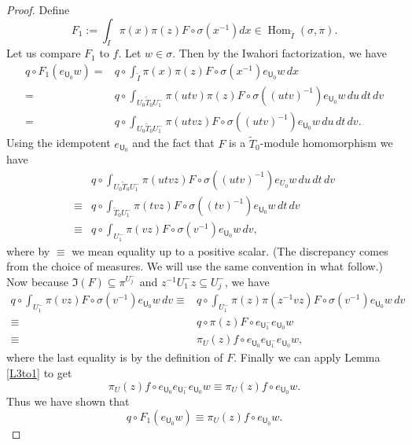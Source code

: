 \documentclass[10pt,a4paper]{amsart}
\newcommand{\Hom}{\operatorname{Hom}}
\newcommand{\It}{\widetilde{I}}
\newcommand{\Tt}{\widetilde{T}}
\newcommand{\Uf}{\mathsf{U}}
\begin{document}
\begin{proof}
    Define
    \[
    F_{1}:=\int_{\It}\pi(x)\pi(z)F\circ \sigma(x^{-1})dx\in\Hom_{\It}(\sigma,\pi).
    \]
    Let us compare $F_1$ to $f$. Let $w\in \sigma$. Then by the Iwahori factorization, we have
	\begin{align*}
		q\circ F_1(e_{{\Uf}_{0}}w)=&q\circ \int_{\It} \pi(x)\pi(z)F\circ \sigma(x^{-1}) e_{{\Uf}_{0}}w\,dx\\
		=&q\circ \int_{U_{0}\Tt_{0}U^{-}_{1}} \pi(utv)\pi(z)F\circ \sigma((utv)^{-1}) e_{{\Uf}_{0}}w \,du\,dt\,dv\\
		=&q\circ \int_{U_{0}\Tt_{0}U^{-}_{1}} \pi(utvz)F\circ \sigma((utv)^{-1}) e_{{\Uf}_{0}}w \,du\,dt\,dv.
	\end{align*}
	Using the idempotent $e_{{\Uf}_{0}}$ and the fact that $F$ is a $\Tt_{0}$-module homomorphism we have 
	\begin{align*}
		&q\circ \int_{U_{0}\Tt_{0}U^{-}_{1}} \pi(utvz)F\circ \sigma((utv)^{-1}) e_{U_{0}}w \,du\, dt\, dv\\
        \equiv&q\circ \int_{\Tt_{0}U^{-}_{1}} \pi(tvz)F\circ \sigma((tv)^{-1}) e_{{\Uf}_{0}}w \,dt\,dv\\
		\equiv&q\circ \int_{U^{-}_{1}} \pi(vz)F\circ \sigma(v^{-1}) e_{{\Uf}_{0}}w \,dv,
	\end{align*}
    where by $\equiv$ we mean equality up to a positive scalar. (The discrepancy comes from the choice of measures. We will use the same convention in what follow.)
	Now because $\Im(F)\subseteq \pi^{U^{-}_{j}}$ and  $z^{-1}U^{-}_{1}z\subseteq U^{-}_{j}$, we have
	\begin{align*}
		q\circ \int_{U^{-}_{1}} \pi(vz)F\circ \sigma(v^{-1}) e_{{\Uf}_{0}}w \,dv
        \equiv&q\circ \int_{U^{-}_{1}} \pi(z)\pi(z^{-1}vz)F\circ \sigma(v^{-1}) e_{{\Uf}_{0}}w \,dv\\
		\equiv&q\circ \pi(z)F\circ e_{{\Uf}^{-}_{1}}e_{{\Uf}_{0}}w\\
		\equiv&\pi_{U}(z)f \circ e_{{\Uf}_{0}}e_{{\Uf}^{-}_{1}}e_{{\Uf}_{0}}w,
	\end{align*}
    where the last equality is by the definition of $F$. Finally we can apply Lemma \ref{L3to1} to get 
	\begin{equation*}
		\pi_{U}(z)f \circ e_{{\Uf}_{0}}e_{{\Uf}^{-}_{1}}e_{{\Uf}_{0}}w\equiv\pi_{U}(z)f \circ e_{{\Uf}_{0}}w.
	\end{equation*}
	Thus we have shown that
	\begin{equation}\label{SurjEq1}
		q\circ F_1(e_{{\Uf}_{0}}w)\equiv\pi_{U}(z)f \circ e_{{\Uf}_{0}}w.
	\end{equation}
	

\end{proof}
\end{document}
